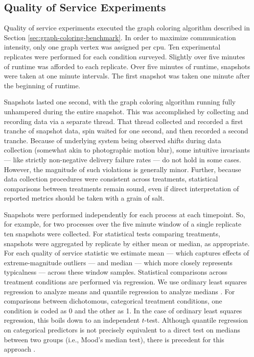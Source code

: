 \subsection{Quality of Service Experiments} \label{sec:quality-of-service-experiments}

Quality of service experiments executed the graph coloring algorithm described in Section \ref{sec:graph-coloring-benchmark}.
In order to maximize communication intensity, only one graph vertex was assigned per cpu.
Ten experimental replicates were performed for each condition surveyed.
Slightly over five minutes of runtime was afforded to each replicate.
Over five minutes of runtime, snapshots were taken at one minute intervals.
The first snapshot was taken one minute after the beginning of runtime.

Snapshots lasted one second, with the graph coloring algorithm running fully unhampered during the entire snapshot.
This was accomplished by collecting and recording data via a separate thread.
That thread collected and recorded a first tranche of snapshot data, spin waited for one second, and then recorded a second tranche.
Because of underlying system being observed shifts during data collection (somewhat akin to photographic motion blur), some intuitive invariants --- like strictly non-negative delivery failure rates --- do not hold in some cases.
However, the magnitude of such violations is generally minor.
Further, because data collection procedures were consistent across treatments, statistical comparisons between treatments remain sound, even if direct interpretation of reported metrics should be taken with a grain of salt.

Snapshots were performed independently for each process at each timepoint.
So, for example, for two processes over the five minute window of a single replicate ten snapshots were collected.
For statistical tests comparing treatments, snapshots were aggregated by replicate by either mean or median, as appropriate.
For each quality of service statistic we estimate mean --- which captures effects of extreme-magnitude outliers --- and median --- which more closely represents typicalness --- across these window samples.
Statistical comparisons across treatment conditions are performed via regression.
We use ordinary least squares regression to analyze means \citep{geladi1986partial} and quantile regression to analyze medians \citep{koenker2001quantile}.
For comparisons between dichotomous, categorical treatment conditions, one condition is coded as 0 and the other as 1.
In the case of ordinary least squares regression, this boils down to an independent $t$-test.
Although quantile regression on categorical predictors is not precisely equivalent to a direct test on medians between two groups (i.e., Mood's median test), there is precedent for this approach \citep{petscher2014quantile, konstantopoulos2019using}.

